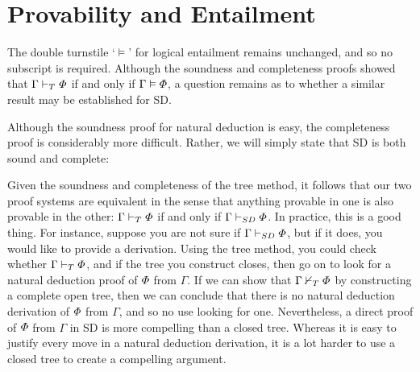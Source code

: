 \section{Provability and Entailment}

The double turnstile `$\models$' for logical entailment remains unchanged, and so no subscript is required.
Although the soundness and completeness proofs showed that $\Gamma \vdash_{T} \varPhi$ if and only if $\Gamma \vDash \varPhi$, a question remains as to whether a similar result may be established for SD.

Although the soundness proof for natural deduction is easy, the completeness proof is considerably more difficult.
Rather, we will simply state that SD is both sound and complete:


Given the soundness and completeness of the tree method, it follows that our two proof systems are equivalent in the sense that anything provable in one is also provable in the other: $\Gamma\vdash_{T}\varPhi$ if and only if $\Gamma\vdash_{SD}\varPhi$.
In practice, this is a good thing.
For instance, suppose you are not sure if $\Gamma \vdash_{SD} \varPhi$, but if it does, you would like to provide a derivation.
Using the tree method, you could check whether $\Gamma \vdash_{T} \varPhi$, and if the tree you construct closes, then go on to look for a natural deduction proof of $\varPhi$ from $\Gamma$. 
If we can show that $\Gamma \nvdash_{T} \varPhi$ by constructing a complete open tree, then we can conclude that there is no natural deduction derivation of $\varPhi$ from $\Gamma$, and so no use looking for one. 
Nevertheless, a direct proof of $\varPhi$ from $\Gamma$ in SD is more compelling than a closed tree.
Whereas it is easy to justify every move in a natural deduction derivation, it is a lot harder to use a closed tree to create a compelling argument.

